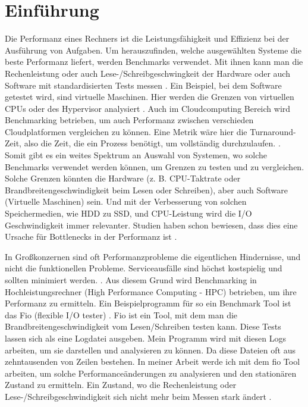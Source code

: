 \documentclass{article}
\begin{document}
\newpage
\section{Einführung}
Die Performanz eines Rechners ist die Leistungsfähigkeit und Effizienz bei der Ausführung von Aufgaben. Um herauszufinden, welche ausgewählten Systeme die beste Performanz liefert, werden Benchmarks verwendet.  
Mit ihnen kann man die Rechenleistung oder auch Lese-/Schreibgeschwingkeit der Hardware oder auch Software mit standardisierten Tests messen \cite{benchmarkingBruno2014}. Ein Beispiel, bei dem Software getestet wird, sind virtuelle Maschinen.
Hier werden die Grenzen von virtuellen CPUs oder des Hypervisor analysiert \cite{9256518}.
Auch im Cloudcomputing Bereich wird Benchmarking betrieben, um auch Performanz zwischen verschieden Cloudplatformen vergleichen zu können. Eine Metrik wäre hier die Turnaround-Zeit, also die Zeit, die ein Prozess benötigt, um vollständig durchzulaufen. \cite{10.1145/2493123.2462919}.  Somit gibt es ein weites Spektrum an Auswahl von Systemen, wo solche Benchmarks verwendet werden können, um Grenzen zu testen und zu vergleichen.
Solche Grenzen könnten die Hardware (z. B. CPU-Taktrate oder Brandbreitengeschwindigkeit beim Lesen oder Schreiben), aber auch Software (Virtuelle Maschinen) sein.
Und mit der Verbesserung von solchen Speichermedien, wie HDD zu SSD, und CPU-Leistung wird die I/O Geschwindigkeit immer relevanter. Studien haben schon bewiesen, dass dies eine Ursache für Bottlenecks in der Performanz ist \cite{analysisNVMeSSD}.

In Großkonzernen sind oft Performanzprobleme die eigentlichen Hindernisse, und nicht die funktionellen Probleme. Serviceausfälle sind höchst kostspielig und sollten minimiert werden. \cite{whenStopPerformanceTest}. 
Aus diesem Grund wird Benchmarking in Hochleistungsrechner (High Performance Computing - HPC) betrieben, um ihre Performanz zu ermitteln.
Ein Beispielprogramm für so ein Benchmark Tool ist das Fio (flexible I/O tester) \cite{axboe2021github}.
Fio ist ein Tool, mit dem man die Brandbreitengeschwindigkeit vom Lesen/Schreiben testen kann. Diese Tests lassen sich als eine Logdatei ausgeben.
Mein Programm wird mit diesen Logs arbeiten, um sie darstellen und analysieren zu können. Da diese Dateien oft aus zehntausenden von Zeilen bestehen.
In meiner Arbeit werde ich mit dem fio Tool arbeiten, um solche Performanceänderungen zu analysieren und den stationären Zustand zu ermitteln. Ein Zustand, wo die Rechenleistung oder Lese-/Schreibgeschwindigkeit sich nicht mehr beim Messen stark ändert \cite{vmsHotandCold}.
\end{document}

